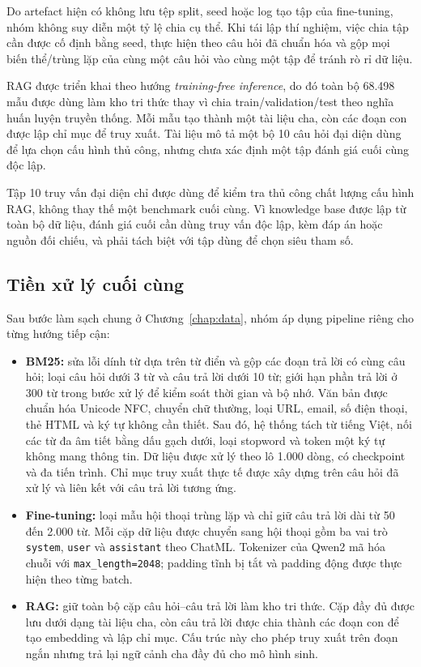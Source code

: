 \documentclass[12pt,a4paper,oneside]{report}
\begin{document}
Do artefact hiện có không lưu tệp split, seed hoặc log tạo tập của fine-tuning, nhóm không suy diễn một tỷ lệ chia cụ thể. Khi tái lập thí nghiệm, việc chia tập cần được cố định bằng seed, thực hiện theo câu hỏi đã chuẩn hóa và gộp mọi biến thể/trùng lặp của cùng một câu hỏi vào cùng một tập để tránh rò rỉ dữ liệu.

RAG được triển khai theo hướng \textit{training-free inference}, do đó toàn bộ 68.498 mẫu được dùng làm kho tri thức thay vì chia train/validation/test theo nghĩa huấn luyện truyền thống. Mỗi mẫu tạo thành một tài liệu cha, còn các đoạn con được lập chỉ mục để truy xuất. Tài liệu mô tả một bộ 10 câu hỏi đại diện dùng để lựa chọn cấu hình thủ công, nhưng chưa xác định một tập đánh giá cuối cùng độc lập.

Tập 10 truy vấn đại diện chỉ được dùng để kiểm tra thủ công chất lượng cấu hình RAG, không thay thế một benchmark cuối cùng. Vì knowledge base được lập từ toàn bộ dữ liệu, đánh giá cuối cần dùng truy vấn độc lập, kèm đáp án hoặc nguồn đối chiếu, và phải tách biệt với tập dùng để chọn siêu tham số.

\subsection{Tiền xử lý cuối cùng}
Sau bước làm sạch chung ở Chương~\ref{chap:data}, nhóm áp dụng pipeline riêng cho từng hướng tiếp cận:

\begin{itemize}
    \item \textbf{BM25:} sửa lỗi dính từ dựa trên từ điển và gộp các đoạn trả lời có cùng câu hỏi; loại câu hỏi dưới 3 từ và câu trả lời dưới 10 từ; giới hạn phần trả lời ở 300 từ trong bước xử lý để kiểm soát thời gian và bộ nhớ. Văn bản được chuẩn hóa Unicode NFC, chuyển chữ thường, loại URL, email, số điện thoại, thẻ HTML và ký tự không cần thiết. Sau đó, hệ thống tách từ tiếng Việt, nối các từ đa âm tiết bằng dấu gạch dưới, loại stopword và token một ký tự không mang thông tin. Dữ liệu được xử lý theo lô 1.000 dòng, có checkpoint và đa tiến trình. Chỉ mục truy xuất thực tế được xây dựng trên câu hỏi đã xử lý và liên kết với câu trả lời tương ứng.
    \item \textbf{Fine-tuning:} loại mẫu hội thoại trùng lặp và chỉ giữ câu trả lời dài từ 50 đến 2.000 từ. Mỗi cặp dữ liệu được chuyển sang hội thoại gồm ba vai trò \texttt{system}, \texttt{user} và \texttt{assistant} theo ChatML. Tokenizer của Qwen2 mã hóa chuỗi với \texttt{max\_length=2048}; padding tĩnh bị tắt và padding động được thực hiện theo từng batch.
    \item \textbf{RAG:} giữ toàn bộ cặp câu hỏi--câu trả lời làm kho tri thức. Cặp đầy đủ được lưu dưới dạng tài liệu cha, còn câu trả lời được chia thành các đoạn con để tạo embedding và lập chỉ mục. Cấu trúc này cho phép truy xuất trên đoạn ngắn nhưng trả lại ngữ cảnh cha đầy đủ cho mô hình sinh.
\end{itemize}
\end{document}
